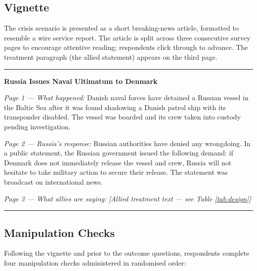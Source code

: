 \subsection{Vignette}

The crisis scenario is presented as a short breaking-news article, formatted to resemble a wire service report. The article is split across three consecutive survey pages to encourage attentive reading; respondents click through to advance. The treatment paragraph (the allied statement) appears on the third page.

\bigskip
\noindent\rule{\textwidth}{0.4pt}
\smallskip


\medskip

\noindent \textbf{Russia Issues Naval Ultimatum to Denmark}

\medskip

\noindent \textit{Page 1 --- What happened:} Danish naval forces have detained a Russian vessel in the Baltic Sea after it was found shadowing a Danish patrol ship with its transponder disabled. The vessel was boarded and its crew taken into custody pending investigation.

\medskip

\noindent \textit{Page 2 --- Russia's response:} Russian authorities have denied any wrongdoing. In a public statement, the Russian government issued the following demand: if Denmark does not immediately release the vessel and crew, Russia will not hesitate to take military action to secure their release. The statement was broadcast on international news.

\medskip

\noindent \textit{Page 3 --- What allies are saying:} \textit{[Allied treatment text --- see Table \ref{tab:design}]}

\smallskip
\noindent\rule{\textwidth}{0.4pt}
\bigskip

\subsection{Manipulation Checks}

Following the vignette and prior to the outcome questions, respondents complete four manipulation checks administered in randomised order:

